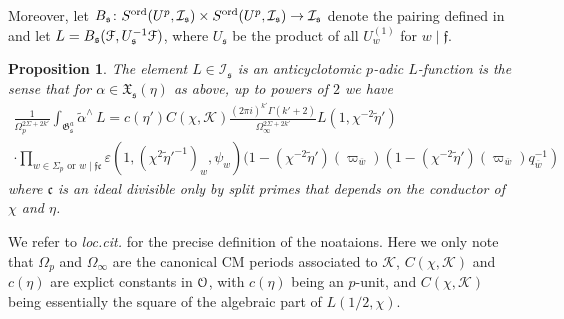 \documentclass[leqno]{amsart}
\newtheorem{prop}[thm]{Proposition}
\theoremstyle{definition}
\theoremstyle{remark}
\newcommand{\eo}{\EuScript{O}}
\newcommand{\fc}{\mathfrak{c}}
\newcommand{\ff}{\mathfrak{f}}
\newcommand{\fs}{\mathfrak{s}}
\newcommand{\K}{{\mathcal{K}}} %
\newcommand{\bw}{{\overline{w}}}
\newcommand{\fG}{\mathfrak{G}}
\newcommand{\fX}{\mathfrak{X}}
\newcommand{\euF}{\EuScript{F}} %
\newcommand{\I}{\mathcal{I}} %
\newcommand{\ord}{\textnormal{ord}} %
\begin{document}
Moreover, let
$B_\fs\colon S^{\ord}(U^p,\I_\fs)\times 
S^{\ord}(U^p,\I_\fs)\to\I_\fs$ 
denote the pairing defined in \cite[\S 6.4.1]{lee}
and let $L=B_\fs(\euF,U_\fs^{-1}\euF)$,
where $U_{\fs}$ be the product of all $U_w^{(1)}$ for $w\mid\ff$.
\begin{prop}\cite[Thm 7.7]{lee}\label{prop:function}
The element $L\in \I_\fs$
is an anticyclotomic $p$-adic $L$-function is the sense that
for $\alpha\in \fX_\fs(\eta)$ as above,
up to powers of $2$ we have
\begin{multline*}
	\frac{1}{\Omega_p^{2\Sigma+2k'}}
	\int_{\fG_{\fs}^a}\tilde{\alpha}^\wedge\,L=
	c(\eta')C(\chi,\K)
	\frac{(2\pi i)^{k'}\Gamma(k'+2)
	}{\Omega_\infty^{2\Sigma+2k'}}
    L(1,\chi^{-2}\tilde{\eta}')\\\cdot
	\prod_{w\in\Sigma_p\text{ or }w\mid\ff\fc}
	\varepsilon(1,(\chi^{2}\tilde{\eta}'^{-1})_w,\psi_w)
	(1-(\chi^{-2}\tilde{\eta}')(\varpi_{\bw})
	(1-(\chi^{-2}\tilde{\eta}')(\varpi_{\bw})q_{\bw}^{-1})
\end{multline*}
where $\fc$ is an ideal divisible only by split primes
that depends on the conductor of $\chi$ and $\eta$.
\end{prop}
We refer to \textit{loc.cit.} for the precise definition
of the noataions.
Here we only note that
$\Omega_p$ and $\Omega_\infty$
are the canonical CM periods associated to $\K$,
$C(\chi,\K)$ and $c(\eta)$ are explict constants in $\eo$,
with $c(\eta)$ being an $p$-unit,
and $C(\chi,\K)$ being
essentially the square of the algebraic part
of $L(1/2,\chi)$.
\end{document}

